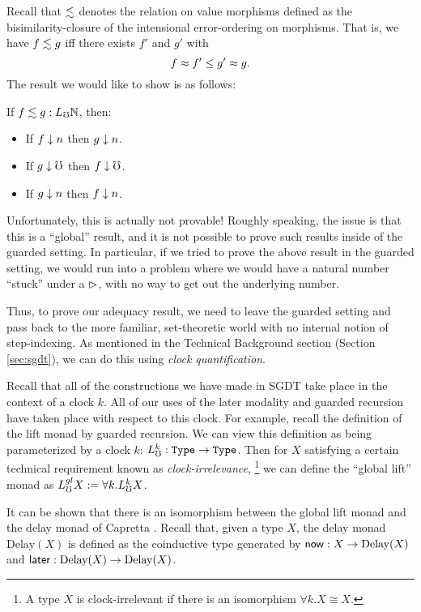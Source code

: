 Recall that $\lesssim$ denotes the relation on value morphisms defined as the bisimilarity-closure
of the intensional error-ordering on morphisms.
That is, we have $f \lesssim g$ iff there exists $f'$ and $g'$ with
%
\[ f \approx f' \le g' \approx g. \]
%
The result we would like to show is as follows:
\begin{lemma}
If $f \lesssim g : L_\mho \mathbb{N}$, then:
\begin{itemize}
  \item If $f \downarrow n$ then $g \downarrow n$.
  \item If $g \downarrow \mho$ then $f \downarrow \mho$.
  \item If $g \downarrow n$ then $f \downarrow n$.
\end{itemize}
\end{lemma}
%
Unfortunately, this is actually not provable!
Roughly speaking, the issue is that this is a ``global'' result, and it is not possible
to prove such results inside of the guarded setting. 
In particular, if we tried to prove the above result in the guarded
setting, we would run into a problem where we would have a natural number
``stuck'' under a $\vartriangleright$, with no way to get out the underlying number.

Thus, to prove our adequacy result, we need to leave the guarded setting and pass back
to the more familiar, set-theoretic world with no internal notion of step-indexing.
As mentioned in the Technical Background section (Section \ref{sec:sgdt}), we can do this
using \emph{clock quantification}.

Recall that all of the constructions we have made in SGDT take place in the context of a clock $k$.
All of our uses of the later modality and guarded recursion have taken place with respect to this clock.
For example, recall the definition of the lift monad by guarded recursion.
We can view this definition as being parameterized by a clock $k$: $L_\mho^k : \texttt{Type} \to \texttt{Type}$.
Then for $X$ satisfying a certain technical requirement known as \emph{clock-irrelevance},
\footnote{A type $X$ is clock-irrelevant if there is an isomorphism $\forall k.X \cong X$.}
we can define the ``global lift'' monad as $L_\mho^{gl} X := \forall k. L_\mho^k X$.

It can be shown that there is an isomorphism between the global lift monad and the
delay monad of Capretta \cite{lmcs:2265}.
Recall that, given a type $X$, the delay monad $\text{Delay}(X)$ is defined as the coinductive
type generated by 
$\mathsf{now} : X \to \text{Delay}(X)$ and $\mathsf{later} : \text{Delay}(X) \to \text{Delay}(X)$.

